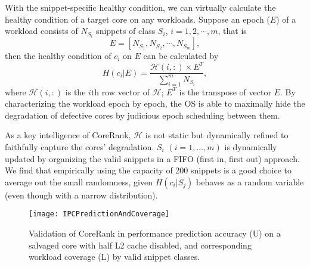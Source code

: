 With the snippet-specific healthy condition, we can virtually calculate the healthy condition of a target core on any workloads. Suppose an epoch ($E$) of  a workload consists of $N_{S_i}$ snippets of class $S_i$, $i=1, 2, \cdots, m$, that is
\begin{equation}
E=[N_{S_1}, N_{S_2}, \cdots, N_{S_m}],
\end{equation}
then the healthy condition of  $c_i$ on $E$ can be calculated by
\begin{equation}\label{workloadperf}
  H(c_i|E) = \frac{\mathcal{H}(i, :)\times E^T}{\sum_{i=1}^{m}N_{S_i}},
\end{equation}
where $\mathcal{H}(i, :)$ is the $i$th row vector of $\mathcal{H}$; $E^T$ is the transpose of vector $E$. By characterizing the workload epoch by epoch, the OS is able to maximally hide the degradation of defective cores by judicious epoch scheduling between them. 

As a key intelligence of CoreRank, $\mathcal{H}$ is not static but dynamically refined to faithfully capture the cores' degradation.  $S_i$ $(i=1, \ldots, m)$ is dynamically updated by organizing the valid snippets in a FIFO (first in, first out) approach. We find that empirically using the capacity of 200 snippets  is a good choice to average out the small randomness, given $H(c_i|S_j)$ behaves as a random variable (even though with a narrow distribution).

\begin{figure}[t]
  \centering
  \texttt{[image: IPCPredictionAndCoverage]}\\
  \caption{Validation of CoreRank in performance prediction accuracy (U) on a salvaged core with half L2 cache disabled, and corresponding workload coverage (L) by valid snippet classes.}\label{prederror}
\end{figure}



